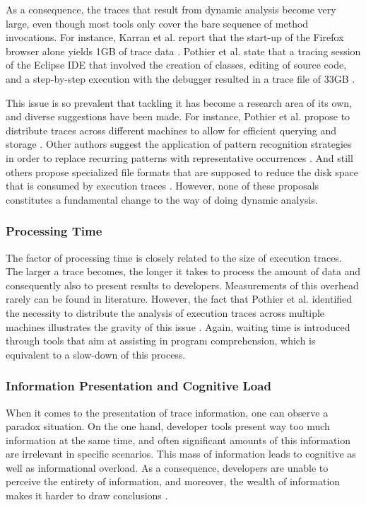 As a consequence, the traces that result from dynamic analysis become very large, even though most tools only cover the bare sequence of method invocations.
For instance, Karran et al. report that the start-up of the Firefox browser alone yields 1GB of trace data \cite{karran_extraction_2013}.
Pothier et al. state that a tracing session of the Eclipse IDE that involved the creation of classes, editing of source code, and a step-by-step execution with the debugger resulted in a trace file of 33GB \cite{pothier_scalable_2007}.

This issue is so prevalent that tackling it has become a research area of its own, and diverse suggestions have been made.
For instance, Pothier et al. propose to distribute traces across different machines to allow for efficient querying and storage \cite{pothier_scalable_2007}.
Other authors suggest the application of pattern recognition strategies in order to  replace recurring patterns with representative occurrences \cite{de_pauw_execution_1998, systa_shimba_2001, richner_using_2002}.
And still others propose specialized file formats that are supposed to reduce the disk space that is consumed by execution traces \cite{johnson_lossless_1994, milenkovic_exploiting_2003}.
However, none of these proposals constitutes a fundamental change to the way of doing dynamic analysis.

\subsubsection{Processing Time}
The factor of processing time is closely related to the size of execution traces.
The larger a trace becomes, the longer it takes to process the amount of data and consequently also to present results to developers.
Measurements of this overhead rarely can be found in literature.
However, the fact that Pothier et al. identified the necessity to distribute the analysis of execution traces across multiple machines illustrates the gravity of this issue \cite{pothier_scalable_2007}.
Again, waiting time is introduced through tools that aim at assisting in program comprehension, which is equivalent to a slow-down of this process.

\subsubsection{Information Presentation and Cognitive Load}
When it comes to the presentation of trace information, one can observe a paradox situation.
On the one hand, developer tools present way too much information at the same time, and often significant amounts of this information are irrelevant in specific scenarios.
This mass of information leads to cognitive as well as informational overload.
As a consequence, developers are unable to perceive the entirety of information, and moreover, the wealth of information makes it harder to draw conclusions \cite{hiltz_structuring_1985, sheridan_man-machine_1981}.

